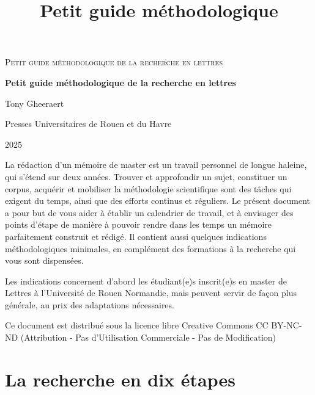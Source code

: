 \documentclass[12pt,twoside,final,openright]{book}
\begin{document}
\fontsize{13pt}{15pt}\selectfont %

\title{Petit guide méthodologique} %

\newpage
\thispagestyle{empty} %
\vspace*{1cm} %
\begin{center}
	\onehalfspacing
	{\LARGE\textsc{Petit guide méthodologique de la recherche en lettres}} %
\end{center}
\newpage

\begin{titlepage}
	\centering
	 \vspace*{3cm} %
	{\huge\bfseries Petit guide méthodologique de la recherche en lettres \par}
	\vspace{2cm}
	{\Large Tony Gheeraert\par}
	\vfill
	{\Large Presses Universitaires de Rouen et du Havre \par}
	\vspace{0.5cm}
	{\large 2025}
\end{titlepage}

\thispagestyle{empty}
La rédaction d’un mémoire de master est un travail personnel de longue haleine, qui s’étend sur deux années. Trouver et approfondir un sujet, constituer un corpus, acquérir et mobiliser la méthodologie scientifique sont des tâches qui exigent du temps, ainsi que des efforts continus et réguliers. Le présent document a pour but de vous aider à établir un calendrier de travail, et à envisager des points d’étape de manière à pouvoir rendre dans les temps un mémoire parfaitement construit et rédigé. Il contient aussi quelques indications méthodologiques minimales, en complément des formations à la recherche qui vous sont dispensées.

Les indications concernent d’abord les étudiant(e)s inscrit(e)s en master de Lettres à l’Université de Rouen Normandie, mais peuvent servir de façon plus générale, au prix des adaptations nécessaires.

Ce document est distribué sous la licence libre Creative Commons CC BY-NC-ND (Attribution - Pas d’Utilisation Commerciale - Pas de Modification)

\chapter{La recherche en dix étapes}
\setcounter{page}{1}
\end{document}
